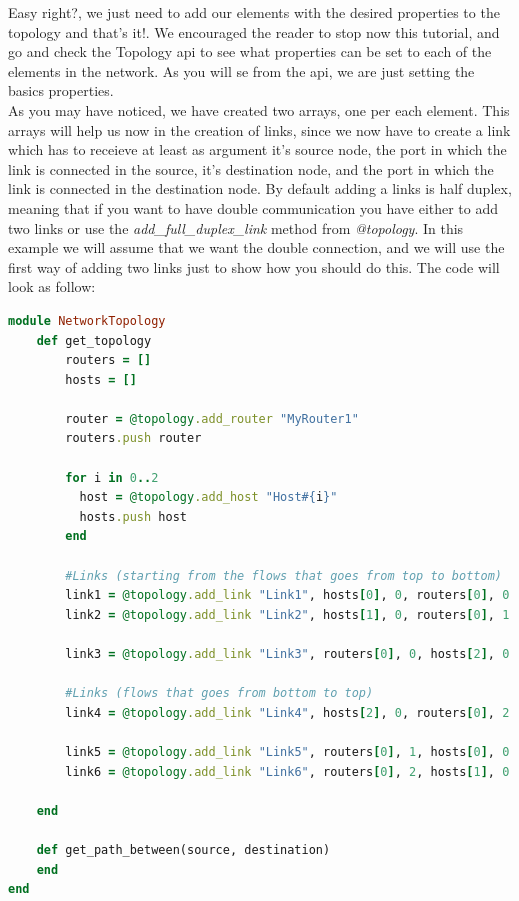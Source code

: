 Easy right?, we just need to add our elements with the desired properties to the topology and that's it!. We encouraged the reader to stop now this tutorial, and go and check the Topology api to see what properties can be set to each of the elements in the network. As you will se from the api, we are just setting the basics properties.\\
As you may have noticed, we have created two arrays, one per each element. This arrays will help us now in the creation of links, since we now have to create a link which has to receieve at least as argument it's source node, the port in which the link is connected in the source, it's destination node, and the port in which the link is connected in the destination node. By default adding a links is half duplex, meaning that if you want to have double communication you have either to add two links or use the \textit{add\_full\_duplex\_link} method from \textit{@topology}. In this example we will assume that we want the double connection, and we will use the first way of adding two links just to show how you should do this. The code will look as follow:

\begin{lstlisting}[language=Ruby,breaklines=true]
module NetworkTopology
	def get_topology
		routers = []
        hosts = []

        router = @topology.add_router "MyRouter1"
        routers.push router

        for i in 0..2  
          host = @topology.add_host "Host#{i}"
          hosts.push host     
        end
        
        #Links (starting from the flows that goes from top to bottom)    
        link1 = @topology.add_link "Link1", hosts[0], 0, routers[0], 0
        link2 = @topology.add_link "Link2", hosts[1], 0, routers[0], 1

        link3 = @topology.add_link "Link3", routers[0], 0, hosts[2], 0

        #Links (flows that goes from bottom to top)    
        link4 = @topology.add_link "Link4", hosts[2], 0, routers[0], 2

        link5 = @topology.add_link "Link5", routers[0], 1, hosts[0], 0
        link6 = @topology.add_link "Link6", routers[0], 2, hosts[1], 0
        
	end
    
    def get_path_between(source, destination)
    end
end
\end{lstlisting}

